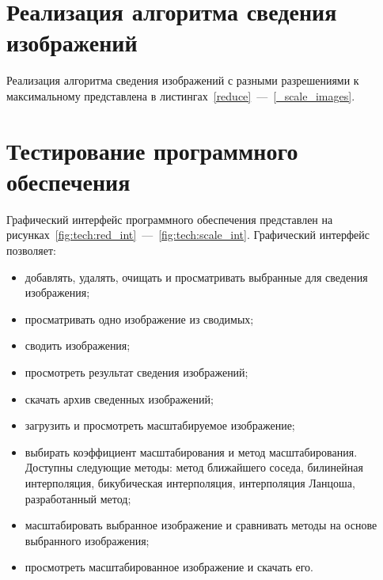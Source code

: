 \section{Реализация алгоритма сведения изображений}

Реализация алгоритма сведения изображений с разными разрешениями к максимальному представлена в листингах~\ref{reduce}~---~\ref{_scale_images}. 







\section{Тестирование программного обеспечения}

Графический интерфейс программного обеспечения представлен на рисунках~\ref{fig:tech:red_int}~---~\ref{fig:tech:scale_int}. Графический интерфейс позволяет:

\begin{itemize}[label=---]
    \item добавлять, удалять, очищать и просматривать выбранные для сведения изображения;
    \item просматривать одно изображение из сводимых;
    \item сводить изображения;
    \item просмотреть результат сведения изображений;
    \item скачать архив сведенных изображений;
    \item загрузить и просмотреть масштабируемое изображение;
    \item выбирать коэффициент масштабирования и метод масштабирования. Доступны следующие методы: метод ближайшего соседа, билинейная интерполяция, бикубическая интерполяция, интерполяция Ланцоша, разработанный метод;
    \item масштабировать выбранное изображение и сравнивать методы на основе выбранного изображения;
    \item просмотреть масштабированное изображение и скачать его. 
\end{itemize}

